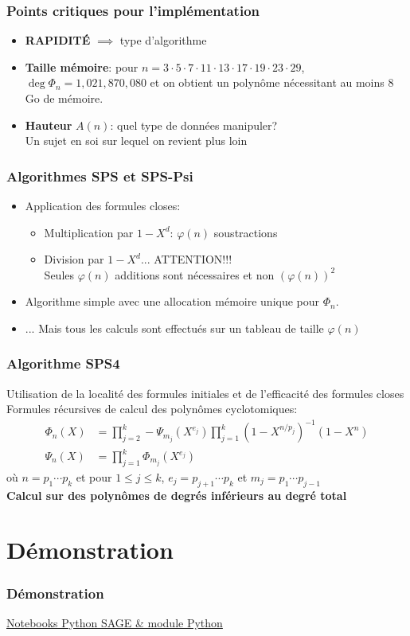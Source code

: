 \documentclass{beamer}
\begin{document}
	\begin{frame}
		\frametitle{Points critiques pour l'implémentation}
		\begin{itemize}
			\item \textbf{RAPIDITÉ} $\implies$ type d'algorithme
			\item \textbf{Taille mémoire}: pour $n = 3 \cdot 5 \cdot 7 \cdot 11 \cdot 13 \cdot 17 \cdot 19 \cdot 23 \cdot 29$, $\deg \Phi_n = 1,021,870,080$ et on obtient un polynôme nécessitant au moins 8 Go de mémoire.
			\item \textbf{Hauteur} $A(n)$: quel type de données manipuler?\\
			Un sujet en soi sur lequel on revient plus loin		
		\end{itemize}
	\end{frame}

	\begin{frame}
		\frametitle{Algorithmes SPS et SPS-Psi}
		\begin{itemize}
			\item 
			Application des formules closes:
			\begin{itemize}
				\item Multiplication par $1-X^d$: $\varphi(n)$ soustractions
				\item Division par $1-X^d$... ATTENTION!!!\\
				Seules $\varphi(n)$ additions sont nécessaires et non $\left(\varphi(n)\right)^2$
			\end{itemize}
			\item Algorithme simple avec une allocation mémoire unique pour $\Phi_n$.
			\item... Mais tous les calculs sont effectués sur un tableau de taille $\varphi(n)$
		\end{itemize}		
		
	\end{frame}

	\begin{frame}
	\frametitle{Algorithme SPS4}
	Utilisation de la localité des formules initiales et de l'efficacité des formules closes\\
	
	Formules récursives de calcul des polynômes cyclotomiques:	
	\begin{align*}
		\Phi_n(X) &=\prod_{j=2}^{k} - \Psi_{m_j}(X^{e_j}) \prod_{j=1}^{k} (1-X^{n/p_j})^{-1}(1-X^n)\tag{3.17}\label{recurphi}\\
		\Psi_{n}(X) &=\prod_{j=1}^{k} \Phi_{m_j}(X^{e_j})\tag{3.25}\label{recurpsi}
	\end{align*}
	où $n = p_1 \cdots p_k$ et pour $1 \le j \le k$, $e_j = p_{j+1} \cdots p_k$ et $m_j = p_1 \cdots p_{j-1}$\\
	\textbf{Calcul sur des polynômes de degrés inférieurs au degré total}
	
	\end{frame}
	
	\section{Démonstration}
	\begin{frame}
		\frametitle{Démonstration}
		
		\href{https://jupyter.math.sorbonne-universite.fr/user/21304439/lab}{Notebooks Python SAGE \& module Python}
		
	\end{frame}
	
\end{document}
